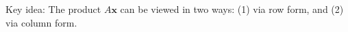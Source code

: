 \documentclass[preview]{standalone}
\begin{document}
\begin{center}
Key idea: The product $A\mathbf{x}$ can be viewed in two ways: (1) via row form, and (2) via column form.
\end{center}
\end{document}
